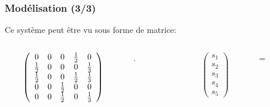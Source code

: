 \documentclass{beamer}
\begin{document}
\begin{frame}
  \frametitle{Modélisation (3/3)}
  
  Ce système peut être vu sous forme de matrice:\\
  \begin{columns}

    \begin{column}[l]{0.3\linewidth}
      \begin{minipage}{0.3\linewidth}
        \[ \left(
          \begin{array}{ c c c c c}
            0           & 0 & 0           & \frac{1}{2} & 0           \\
            \frac{1}{2} & 0 & 0           & 0           & \frac{1}{3} \\
            \frac{1}{2} & 0 & 0           & \frac{1}{2} & \frac{1}{3} \\
            0           & 0 & \frac{1}{2} & 0           & 0           \\
            0           & 0 & \frac{1}{2} & 0           & \frac{1}{3}
          \end{array} \right)
        \]
      \end{minipage}
    \end{column}

    \begin{column}[r]{0.0001\linewidth}
      \begin{minipage}{0.0001\linewidth}
        .
      \end{minipage}
    \end{column}

    
    \begin{column}[c]{0.05\linewidth}
      \begin{minipage}{0.05\linewidth}
        \[ \left(
          \begin{array}{ c }
            s_1 \\
            s_2 \\
            s_3 \\
            s_4 \\
            s_5
          \end{array} \right)
        \]
      \end{minipage}
    \end{column}

    \begin{column}[r]{0.01\linewidth}
      \begin{minipage}{0.01\linewidth}
          =
      \end{minipage}
    \end{column}


\end{columns}
\end{frame}
\end{document}
